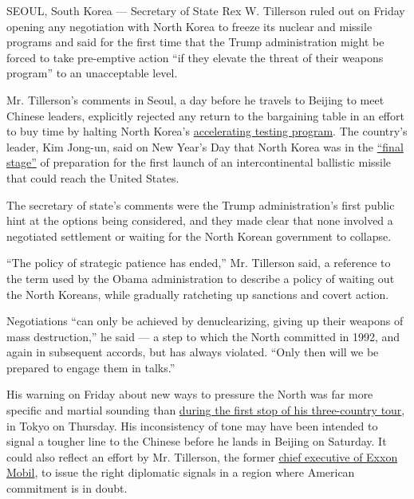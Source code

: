 SEOUL, South Korea --- Secretary of State Rex W. Tillerson ruled out on
Friday opening any negotiation with North Korea to freeze its nuclear
and missile programs and said for the first time that the Trump
administration might be forced to take pre-emptive action ``if they
elevate the threat of their weapons program'' to an unacceptable level.

Mr. Tillerson's comments in Seoul, a day before he travels to Beijing to
meet Chinese leaders, explicitly rejected any return to the bargaining
table in an effort to buy time by halting North Korea's
\href{https://www.nytimes3xbfgragh.onion/2017/02/17/world/asia/north-korea-nuclear-threat.html}{accelerating
testing program}. The country's leader, Kim Jong-un, said on New Year's
Day that North Korea was in the
\href{https://www.nytimes3xbfgragh.onion/2017/01/01/world/asia/north-korea-intercontinental-ballistic-missile-test-kim-jong-un.html}{``final
stage''} of preparation for the first launch of an intercontinental
ballistic missile that could reach the United States.

The secretary of state's comments were the Trump administration's first
public hint at the options being considered, and they made clear that
none involved a negotiated settlement or waiting for the North Korean
government to collapse.

``The policy of strategic patience has ended,'' Mr. Tillerson said, a
reference to the term used by the Obama administration to describe a
policy of waiting out the North Koreans, while gradually ratcheting up
sanctions and covert action.

Negotiations ``can only be achieved by denuclearizing, giving up their
weapons of mass destruction,'' he said --- a step to which the North
committed in 1992, and again in subsequent accords, but has always
violated. ``Only then will we be prepared to engage them in talks.''

His warning on Friday about new ways to pressure the North was far more
specific and martial sounding than
\href{https://www.nytimes3xbfgragh.onion/2017/03/16/world/asia/rex-tillerson-asia-trump-us-japan.html}{during
the first stop of his three-country tour}, in Tokyo on Thursday. His
inconsistency of tone may have been intended to signal a tougher line to
the Chinese before he lands in Beijing on Saturday. It could also
reflect an effort by Mr. Tillerson, the former
\href{https://www.nytimes3xbfgragh.onion/interactive/2017/01/11/us/politics/rex-tillerson-exxon-maverick-oil-diplomacy.html}{chief
executive of Exxon Mobil}, to issue the right diplomatic signals in a
region where American commitment is in doubt.

